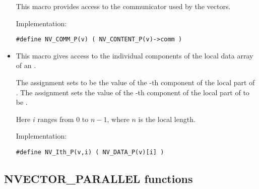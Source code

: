 \begin{itemize}
  This macro provides access to the {\mpi} communicator used by the {\nvecp}
  vectors.

  Implementation:

  \verb|#define NV_COMM_P(v) ( NV_CONTENT_P(v)->comm )|

\item {}

  This macro gives access to the individual components of the local data
  array of an .

  The assignment  sets  to be the value of
  the -th component of the local part of .
  The assignment 
  sets the value of the -th component of the local part of 
  to be .

  Here $i$ ranges from $0$ to $n-1$, where $n$ is the local length.

  Implementation:

  \verb|#define NV_Ith_P(v,i) ( NV_DATA_P(v)[i] )|

\end{itemize}


\subsection{NVECTOR\_PARALLEL functions}
\label{ss:nvec_par_functions}


